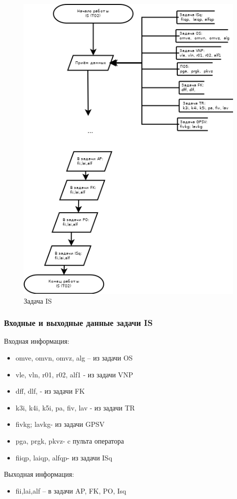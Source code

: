 \begin{figure}[H]
    \centering
    \includegraphics[width=0.75\linewidth]{images/IS_simple.png}
    \caption{Задача IS}
    \label{fig:IS}
\end{figure}
\subsubsection{Входные и выходные данные задачи IS}
Входная информация:
\begin{itemize}
    \item omve,  omvn,  omvz,  alg – из задачи OS
    \item vle, vln, r01, r02, alf1 - из задачи  VNP
    \item dff, dlf, - из задачи  FK
    \item k3i, k4i, k5i, pa, fiv, lav - из задачи  TR
    \item fivkg; lavkg- из задачи  GPSV
    \item pga,  prgk,  pkvz- c пульта оператора
    \item fiiqp,  laiqp, alfqp- из задачи ISq
\end{itemize}
Выходная информация:
\begin{itemize}
    \item fii,lai,alf – в задачи  AP, FK, PO,  Isq
\end{itemize}
